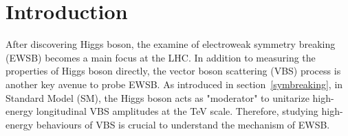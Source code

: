 \section{Introduction}

After discovering Higgs boson\cite{20121, 201230}, the examine of electroweak symmetry breaking (EWSB) becomes a main focus at the LHC.
In addition to measuring the properties of Higgs boson directly, the vector boson scattering (VBS) process is another key avenue to probe EWSB\cite{Lee:1977yc, Chanowitz:1985hj, Szleper:2014xxa}.
As introduced in section~\ref{symbreaking}, in Standard Model (SM), the Higgs boson acts as "moderator" to unitarize high-energy longitudinal VBS amplitudes at the TeV scale.
Therefore, studying high-energy behaviours of VBS is crucial to understand the mechanism of EWSB.

